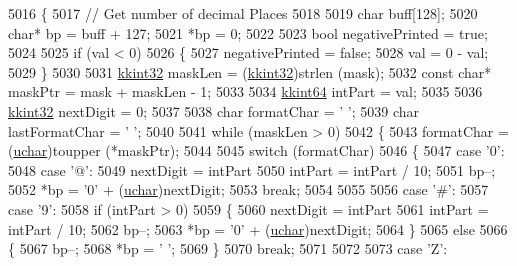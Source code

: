 \begin{DoxyCode}
5016 \{
5017   \textcolor{comment}{// Get number of decimal Places}
5018 
5019   \textcolor{keywordtype}{char}  buff[128];
5020   \textcolor{keywordtype}{char}* bp = buff + 127;
5021   *bp = 0;
5022 
5023   \textcolor{keywordtype}{bool}  negativePrinted = \textcolor{keyword}{true};
5024 
5025   \textcolor{keywordflow}{if}  (val < 0)
5026   \{
5027     negativePrinted = \textcolor{keyword}{false};
5028     val = 0 - val;
5029   \}
5030 
5031   \hyperlink{namespace_k_k_b_a8fa4952cc84fda1de4bec1fbdd8d5b1b}{kkint32} maskLen = (\hyperlink{namespace_k_k_b_a8fa4952cc84fda1de4bec1fbdd8d5b1b}{kkint32})strlen (mask);
5032   \textcolor{keyword}{const} \textcolor{keywordtype}{char}*  maskPtr = mask + maskLen - 1; 
5033 
5034   \hyperlink{namespace_k_k_b_aa3486b1c5ea9162b3b020c69f72826eb}{kkint64}  intPart = val;
5035 
5036   \hyperlink{namespace_k_k_b_a8fa4952cc84fda1de4bec1fbdd8d5b1b}{kkint32}  nextDigit = 0;
5037 
5038   \textcolor{keywordtype}{char}  formatChar = \textcolor{charliteral}{' '};
5039   \textcolor{keywordtype}{char}  lastFormatChar = \textcolor{charliteral}{' '};
5040 
5041   \textcolor{keywordflow}{while}  (maskLen > 0)
5042   \{
5043     formatChar = (\hyperlink{namespace_k_k_b_ace9969169bf514f9ee6185186949cdf7}{uchar})toupper (*maskPtr);
5044 
5045     \textcolor{keywordflow}{switch} (formatChar)
5046     \{
5047       \textcolor{keywordflow}{case}  \textcolor{charliteral}{'0'}: 
5048       \textcolor{keywordflow}{case}  \textcolor{charliteral}{'@'}: 
5049            nextDigit = intPart %
5050            intPart = intPart / 10;
5051            bp--;
5052            *bp = \textcolor{charliteral}{'0'} + (\hyperlink{namespace_k_k_b_ace9969169bf514f9ee6185186949cdf7}{uchar})nextDigit;
5053            \textcolor{keywordflow}{break};
5054 
5055 
5056       \textcolor{keywordflow}{case}  \textcolor{charliteral}{'#'}:
5057       \textcolor{keywordflow}{case}  \textcolor{charliteral}{'9'}:
5058            \textcolor{keywordflow}{if} (intPart > 0)
5059            \{
5060              nextDigit = intPart %
5061              intPart = intPart / 10;
5062              bp--;
5063              *bp = \textcolor{charliteral}{'0'} + (\hyperlink{namespace_k_k_b_ace9969169bf514f9ee6185186949cdf7}{uchar})nextDigit;
5064            \}
5065            \textcolor{keywordflow}{else}
5066            \{
5067              bp--;
5068              *bp = \textcolor{charliteral}{' '};
5069            \}
5070            \textcolor{keywordflow}{break};
5071 
5072 
5073       \textcolor{keywordflow}{case}  \textcolor{charliteral}{'Z'}:

\end{DoxyCode}
